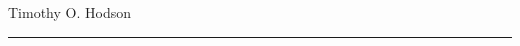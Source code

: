 \documentclass[10pt]{article}
\begin{document}
\begin{cv}{Timothy O. Hodson}
\hrule

\medskip





%



\end{cv}
\end{document}

